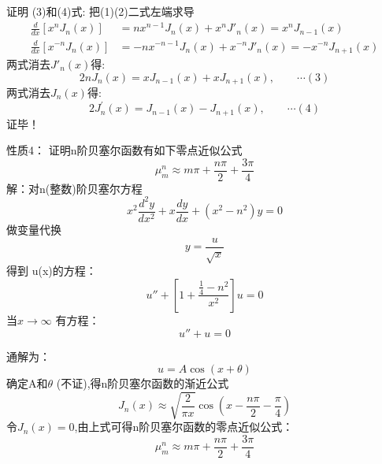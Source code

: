 \begin{frame}
	\alert{证明 (3)和(4)式}: 把(1)(2)二式左端求导
	\begin{equation*}
		\begin{split}
			\frac{d}{dx} [x^n J_n(x)] &=n x^{n-1} J_n(x) + x^n J'_n(x)=x^n J_{n-1}(x) \\
			\frac{d}{d x}\left[x^{-n} J_{n}(x)\right]&=-n x^{-n-1} J_n(x) + x^{-n} J'_n(x)= -x^{-n} J_{n+1}(x)
		\end{split}
	\end{equation*}	
两式消去$J'_n(x)$得:
	\begin{equation*}
		2 n J_{n}(x)=x J_{n-1}(x)+x J_{n+1}(x)  ,\qquad \cdots (3)
	\end{equation*}	 	
两式消去$J_n(x)$得:
	\begin{equation*}
	2 J_{n}^{\prime}(x)=J_{n-1}(x)-J_{n+1}(x)  ,\qquad \cdots (4)
	\end{equation*}	 
\alert{证毕！} 
\end{frame}

\begin{frame}
	\alert{性质4：} 证明n阶贝塞尔函数有如下零点近似公式
	\[ \mu_{m}^{n} \approx m \pi+\frac{n \pi}{2}+\frac{3 \pi}{4}\]
	\alert{解：}对n(整数)阶贝塞尔方程
	\begin{equation*}
		x^2\frac{d^2y}{dx^2} + x\frac{dy}{dx} +(x^2 -n^2)y=0
	\end{equation*}
	做变量代换 \[ y=\frac{u}{\sqrt{x}}\] 
	得到 u(x)的方程：
	\begin{equation*}
		u'' +[1+\frac{\frac{1}{4}-n^2}{x^2}] u=0
	\end{equation*}
	当$x \to \infty $ 有方程：
	\begin{equation*}
		u'' + u=0 
	\end{equation*}	
\end{frame}	

\begin{frame}
	通解为：\[u=A\cos(x+\theta)\]
	确定A和$\theta$ (不证),得n阶贝塞尔函数的渐近公式\\
	\begin{equation*}
		J_{n}(x) \approx \sqrt{\frac{2}{\pi x}} \cos \left(x-\frac{n \pi}{2}-\frac{\pi}{4}\right)
	\end{equation*}
	令$J_{n}(x)=0$,由上式可得n阶贝塞尔函数的零点近似公式：
	\begin{equation*}
		\mu_{m}^{n} \approx m \pi+\frac{n \pi}{2}+\frac{3 \pi}{4}
	\end{equation*}
\end{frame}	


